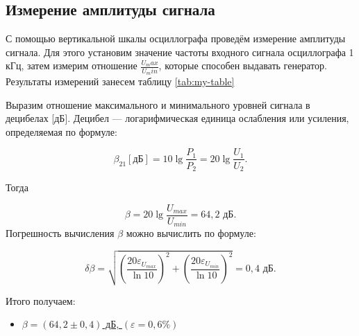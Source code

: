 \documentclass[a4paper,12pt]{article} %
\begin{document}
\subsection{Измерение амплитуды сигнала}

С помощью вертикальной шкалы осциллографа проведём измерение амплитуды сигнала. Для этого установим значение частоты входного сигнала осциллографа 1 кГц, затем измерим отношение $ \frac{U_max}{U_min} $, которые способен выдавать генератор. Результаты измерений занесем  таблицу \ref{tab:my-table}


Выразим отношение максимального и минимального уровней сигнала в
децибелах [дБ]. Децибел — логарифмическая единица ослабления или
усиления, определяемая по формуле:

\begin{equation}
\beta_{21} \left[\text{дБ}\right]=10\lg\frac{P_1}{P_2}=20\lg\frac{U_1}{U_2}.
\end{equation}

Тогда

\begin{equation}
\beta = 20 \lg \frac{U_{max}}{U_{min}} = 64,2 \text{ дБ}.
\end{equation}
Погрешность вычисления $ \beta $ можно вычислить по формуле:

\begin{equation}
\delta \beta = \sqrt{\left(\frac{20\varepsilon_{U_{max}}}{\ln 10}\right)^2+\left(\frac{20\varepsilon_{U_{min}}}{\ln 10}\right)^2} = 0,4 \text{ дБ}.
\end{equation}

Итого получаем:
\begin{itemize}
	\item \underline{$ \beta = \left(64,2 \pm 0,4\right) $ дБ, $ \left(\varepsilon = 0,6 \%\right) $}
\end{itemize}
\end{document}

